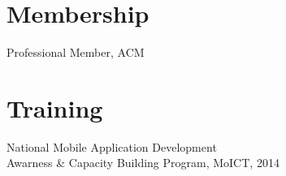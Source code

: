 \documentclass[]{deedy-resume-openfont}
\begin{document}
\begin{minipage}[t]{0.33\textwidth}
\section{Membership}
Professional Member, ACM \\
\sectionsep

\section{Training}
National Mobile Application Development\\Awarness \& Capacity Building Program, MoICT, 2014
\sectionsep


%
%

\end{minipage} 
\hfill
\end{document}
